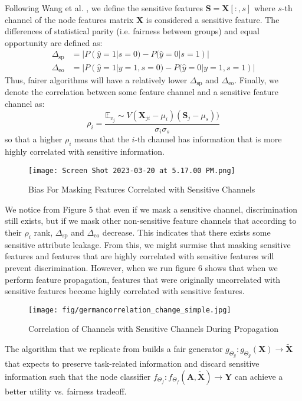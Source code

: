 \documentclass[final]{article}
\begin{document}
Following Wang et al. \cite{Wang_2022}, we define the sensitive features $\textbf{S} = \textbf{X}[:, s]$ where $s$-th channel of the node features matrix $\textbf{X}$ is considered a sensitive feature. The differences of statistical parity (i.e. fairness between groups) and equal opportunity are defined as: 
\begin{align*}
    \Delta_{\text{sp}} &= |P(\hat{y} = 1 | s = 0) - P(\hat{y} = 0 | s = 1)| \\
    \Delta_{\text{eo}} &=|P(\hat{y} = 1 | y=1, s = 0) - P(\hat{y} = 0 | y=1, s = 1)|
\end{align*}
Thus, fairer algorithms will have a relatively lower $ \Delta_{\text{sp}}$ and $\Delta_{\text{eo}}$. Finally, we denote the correlation between some feature channel and a sensitive feature channel as: 
$$\rho_i = \frac{\mathbb{E}_{v_j} \sim V(\textbf{X}_{ji} - \mu_i)(\textbf{S}_j - \mu_s))}{\sigma_i\sigma_s}$$
so that a higher $\rho_i$ means that the $i$-th channel has information that is more highly correlated with sensitive information. 
\begin{figure}[h]
  \centering
 \texttt{[image: Screen Shot 2023-03-20 at 5.17.00 PM.png]}
  \caption{Bias For Masking Features Correlated with Sensitive Channels}
 \end{figure}
 
 We notice from Figure 5 that even if we mask a sensitive channel, discrimination still exists, but if we mask other non-sensitive feature channels that according to their $\rho_i$ rank, 
$ \Delta_{\text{sp}}$ and $\Delta_{\text{eo}}$ decrease. This indicates that there exists some sensitive attribute leakage. From this, we might surmise that masking sensitive features and features that are highly correlated with sensitive features will prevent discrimination. However, when we run figure 6 shows that when we perform feature propagation, features that were originally uncorrelated with sensitive features become highly correlated with sensitive features.
\begin{figure}[h!]
  \centering
 \texttt{[image: fig/germancorrelation\_change\_simple.jpg]}
  \caption{Correlation of Channels with Sensitive Channels During Propagation}
 \end{figure} 

The algorithm that we replicate from \cite{Wang_2022} builds a fair generator $g_{\Theta_g}: g_{\Theta_g}(\textbf{X}) \rightarrow \tilde{\textbf{X}}$ that expects to preserve task-related information and discard sensitive information such that the node classifier $f_{\Theta_f}:f_{\Theta_f}(\textbf{A}, \tilde{\textbf{X}}) \rightarrow \textbf{Y}$ can achieve a better utility vs. fairness tradeoff. 
\end{document}
